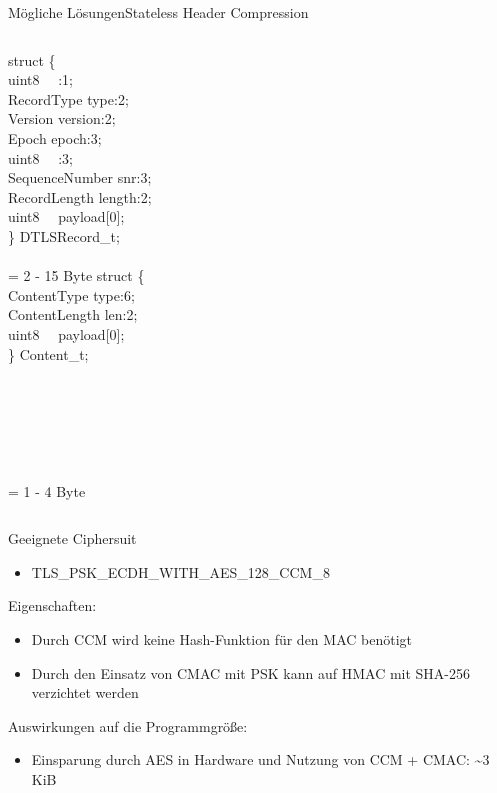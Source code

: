 \documentclass{beamer}
\begin{document}
\begin{frame}{Mögliche Lösungen}{Stateless Header Compression}
  \begin{columns}
      struct \{\\
      \qquad uint8 ~~:1;\\
      \qquad RecordType type:2;\\
      \qquad Version version:2;\\
      \qquad Epoch epoch:3;\\
      \qquad uint8 ~~:3;\\
      \qquad SequenceNumber snr:3;\\
      \qquad RecordLength length:2;\\
      \qquad uint8 ~~payload[0];\\
      \} DTLSRecord\_t;\\
      ~\\
      = 2 - 15 Byte
      struct \{\\
      \qquad ContentType type:6;\\
      \qquad ContentLength len:2;\\
      \qquad uint8 ~~payload[0];\\
      \} Content\_t;\\
      ~\\
      ~\\
      ~\\
      ~\\
      ~\\
      ~\\
      = 1 - 4 Byte
  \end{columns}
\end{frame}

\begin{frame}{Geeignete Ciphersuit}
  \begin{itemize}
    \item TLS\_PSK\_ECDH\_WITH\_AES\_128\_CCM\_8
  \end{itemize}
  Eigenschaften:
  \begin{itemize}
    \item Durch CCM wird keine Hash-Funktion \newline für den MAC benötigt
    \item Durch den Einsatz von CMAC mit PSK kann \newline auf HMAC mit SHA-256 verzichtet werden
  \end{itemize}
  Auswirkungen auf die Programmgröße:
  \begin{itemize}
    \item Einsparung durch AES in Hardware \newline und Nutzung von CCM + CMAC: \textasciitilde 3 KiB
  \end{itemize}
\end{frame}
\end{document}
